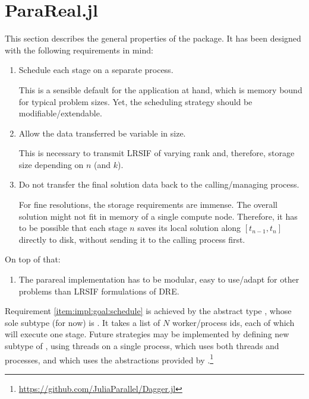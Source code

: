 \section{ParaReal.jl}

This section describes the general properties of the  package.
It has been designed with the following requirements in mind:
\begin{enumerate}
  \item\label{item:impl:goal:schedule}
    Schedule each stage on a separate process.

    This is a sensible default for the application at hand,
    which is memory bound for typical problem sizes.
    Yet, the scheduling strategy should be modifiable/extendable.
  \item\label{item:impl:goal:variablesize}
    Allow the data transferred be variable in size.

    This is necessary to transmit \ac{LRSIF} of varying rank and, therefore, storage size depending on $n$ (and $k$).
  \item\label{item:impl:goal:notransfer}
    Do not transfer the final solution data back to the calling/managing process.

    For fine resolutions, the storage requirements are immense.
    The overall solution might not fit in memory of a single compute node.
    Therefore, it has to be possible that each stage $n$ saves its local solution along $[t_{n-1},t_n]$ directly to disk,
    without sending it to the calling process first.
\end{enumerate}
On top of that:
\begin{enumerate}[resume]
  \item\label{item:impl:goal:modularity}
    The parareal implementation has to be modular,
    \ie easy to use/adapt for other problems than \ac{LRSIF} formulations of \ac{DRE}.
\end{enumerate}

Requirement \ref{item:impl:goal:schedule} is achieved by the abstract type ,
whose sole subtype (for now) is .
It takes a list of $N$ worker/process ids, each of which will execute one stage.
Future strategies may be implemented by defining new subtype of , \eg
{} using threads on a single process,
 which uses both threads and processes, and
 which uses the abstractions provided by .\footnote{\url{https://github.com/JuliaParallel/Dagger.jl}}

